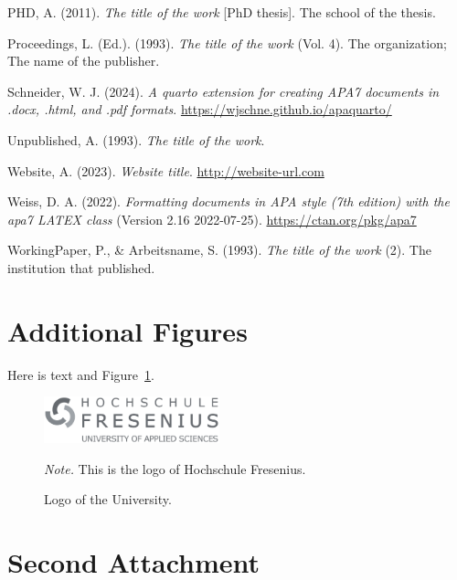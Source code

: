 \documentclass[
  stu,
  floatsintext,
  longtable,
  a4paper,
  nolmodern,
  notxfonts,
  notimes,
  colorlinks=true,linkcolor=black,citecolor=black,urlcolor=black]{apa7}
\newlength{\cslhangindent}
\newenvironment{CSLReferences}[2] %
 {\begin{list}{}{%
  \setlength{\itemindent}{0pt}
  \setlength{\leftmargin}{0pt}
  \setlength{\parsep}{0pt}
  \ifodd #1
   \setlength{\leftmargin}{\cslhangindent}
   \setlength{\itemindent}{-1\cslhangindent}
  \fi
  \setlength{\itemsep}{#2\baselineskip}}}
 {\end{list}}
\begin{document}
\begin{CSLReferences}{1}{0}
PHD, A. (2011). \emph{The title of the work} {[}PhD thesis{]}. The
school of the thesis.

Proceedings, L. (Ed.). (1993). \emph{The title of the work} (Vol. 4).
The organization; The name of the publisher.

Schneider, W. J. (2024). \emph{A quarto extension for creating APA7
documents in .docx, .html, and .pdf formats}.
\url{https://wjschne.github.io/apaquarto/}

Unpublished, A. (1993). \emph{The title of the work}.

Website, A. (2023). \emph{Website title}. \url{http://website-url.com}

Weiss, D. A. (2022). \emph{Formatting documents in {APA} style (7th
edition) with the apa7 {LATEX} class} (Version 2.16 2022-07-25).
\url{https://ctan.org/pkg/apa7}

WorkingPaper, P., \& Arbeitsname, S. (1993). \emph{The title of the
work} (2). The institution that published.

\end{CSLReferences}

\clearpage
\appendix

\section{Additional Figures}\label{sec-Ap1}

Here is text and Figure~\ref{fig-logo4}.

\begin{figure}[h]

{\caption{{Logo of the University.}{\label{fig-logo4}}}}

\includegraphics[width=2in,height=\textheight,keepaspectratio]{logo.png}

\noindent \emph{Note.} This is the logo of Hochschule Fresenius.

\end{figure}

\newpage

\section{Second Attachment}\label{sec-Ap2}
\end{document}
